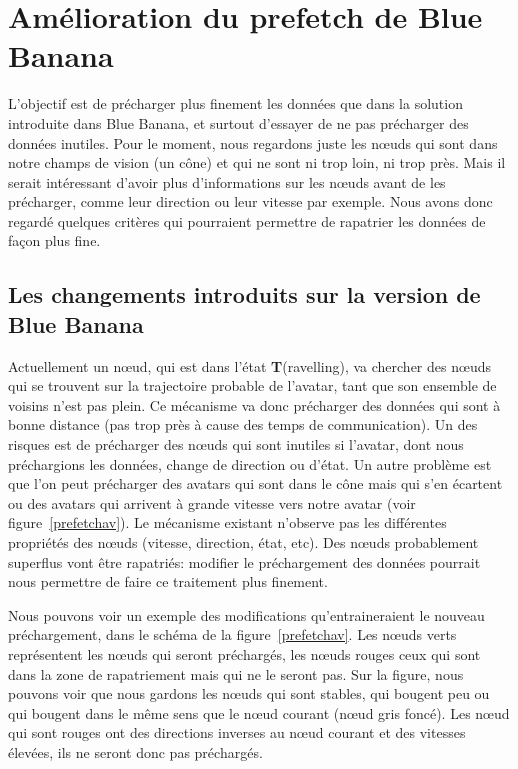 \section{Amélioration du prefetch de Blue Banana}

L'objectif  est de précharger plus finement les données que dans la solution introduite dans Blue Banana, et surtout d'essayer de ne pas précharger des données inutiles. Pour le moment, nous regardons juste les nœuds qui sont dans notre champs de vision (un cône) et qui ne sont ni trop loin, ni trop près. Mais il serait intéressant d'avoir plus d'informations sur les nœuds avant de les précharger, comme leur direction ou leur vitesse par exemple. Nous avons donc regardé quelques critères qui pourraient permettre de rapatrier les données de façon plus fine.

\subsection{Les changements introduits sur la version de Blue Banana}


\par Actuellement un nœud, qui est dans l'état \textbf{T}(ravelling), va chercher des nœuds qui se trouvent sur la trajectoire probable de l'avatar, tant que son ensemble de voisins n'est pas plein. Ce mécanisme va donc précharger des données qui sont à bonne distance (pas trop près à cause des temps de communication). Un des risques est de précharger des nœuds qui sont inutiles si l'avatar, dont nous préchargions les données, change de direction ou d'état. Un autre problème est que l'on peut précharger des avatars qui sont dans le cône mais qui s'en écartent ou des avatars qui arrivent à grande vitesse vers notre avatar (voir figure~\ref{prefetchav}). Le mécanisme existant n'observe pas les différentes propriétés des nœuds (vitesse, direction, état, etc). Des nœuds probablement superflus vont être rapatriés: modifier le préchargement des données pourrait nous permettre de faire ce traitement plus finement.

\par  Nous pouvons voir un exemple des modifications qu'entraineraient le nouveau préchargement, dans le schéma de la figure~\ref{prefetchav}. Les nœuds verts représentent les nœuds qui seront préchargés, les nœuds rouges ceux qui sont dans la zone de rapatriement mais qui ne le seront pas. Sur la figure, nous pouvons voir que nous gardons les nœuds qui sont stables, qui bougent peu ou qui bougent dans le même sens que le nœud courant (nœud gris foncé). Les nœud qui sont rouges ont des directions inverses au nœud courant et des vitesses élevées, ils ne seront donc pas préchargés.

